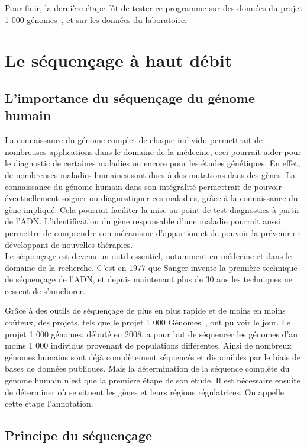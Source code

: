 \documentclass[a4paper,12pt]{article}
\begin{document}
Pour finir, la dernière étape fût de tester ce programme sur des données du projet 1 000 génomes~\cite{1000Genomes}, et sur les données du laboratoire.


\section{Le séquençage à haut débit}

\subsection{L'importance du séquençage du génome humain}

La connaissance du génome complet de chaque individu permettrait de nombreuses applications dans le domaine de la médecine, ceci pourrait aider pour le diagnostic de certaines maladies ou encore pour les études génétiques. En effet, de  nombreuses maladies humaines sont dues à des mutations dans des gènes. La connaissance du génome humain dans son intégralité permettrait de pouvoir éventuellement soigner ou diagnostiquer ces maladies, grâce à la connaissance du gène impliqué. Cela pourrait faciliter la mise au point de test diagnostics à partir de l'ADN. L'identification du gène responsable d'une maladie pourrait aussi permettre de comprendre son mécanisme d'appartion et de pouvoir la prévenir en développant de nouvelles thérapies. \\

Le séquençage est devenu un outil essentiel, notamment en médecine et dans le domaine de la recherche. C'est en 1977 que Sanger invente la première technique de séquençage de l'ADN, et depuis maintenant plus de 30 ans les techniques ne cessent de s'améliorer. 

Grâce à des outils de séquençage de plus en plus rapide et de moins en moins coûteux, des projets, tels que le projet 1 000 Génomes~\cite{1000Genomes}, ont pu voir le jour. Le projet 1 000 génomes, débuté en 2008, a pour but de séquencer les génomes d'au moins 1 000 individus provenant de populations différentes. Ainsi de nombreux génomes humains sont déjà complètement séquencés et disponibles par le biais de bases de données publiques. Mais la détermination de la séquence complète du génome humain n'est que la première étape de son étude. Il est nécessaire ensuite de déterminer où se situent les gènes et leurs régions régulatrices. On appelle cette étape l'annotation. 

\subsection{Principe du séquençage }
\end{document}
